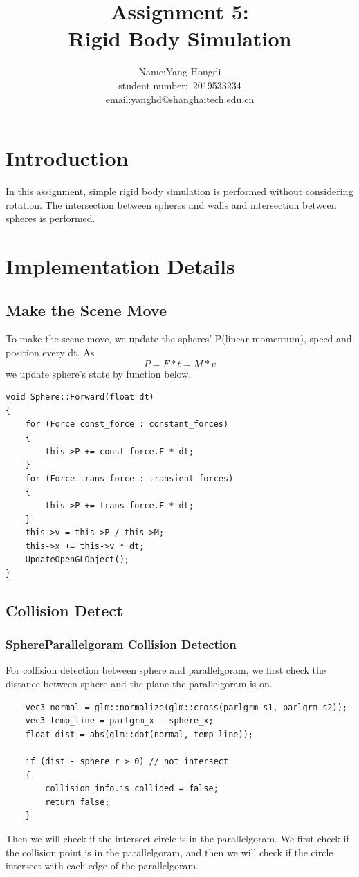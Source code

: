 \documentclass[acmtog]{acmart}
\title{Assignment 5:\\ {Rigid Body Simulation}}
\author{Name:\quad Yang Hongdi  \\ student number:\ 2019533234
\\email:\quad yanghd@shanghaitech.edu.cn}
\begin{document}
\maketitle

\vspace*{2 ex}

\section{Introduction}
In this assignment, simple rigid body simulation is performed without considering rotation. The intersection
between spheres and walls and intersection between spheres is performed.
\section{Implementation Details}
\subsection{Make the Scene Move}
To make the scene move, we update the spheres' P(linear momentum), speed and position every dt. As $$P = F * t = M * v$$
we update sphere's state by function below.
\begin{lstlisting}
void Sphere::Forward(float dt)
{
    for (Force const_force : constant_forces)
    {
        this->P += const_force.F * dt;
    }
    for (Force trans_force : transient_forces)
    {
        this->P += trans_force.F * dt;
    }
    this->v = this->P / this->M;
    this->x += this->v * dt;
    UpdateOpenGLObject();
}
\end{lstlisting}
\subsection{Collision Detect}
\subsubsection{SphereParallelgoram Collision Detection}
\quad For collision detection between sphere and parallelgoram, we first check the distance between sphere and the plane the parallelgoram is on.
\begin{lstlisting}
	vec3 normal = glm::normalize(glm::cross(parlgrm_s1, parlgrm_s2));
    vec3 temp_line = parlgrm_x - sphere_x;
    float dist = abs(glm::dot(normal, temp_line));

    if (dist - sphere_r > 0) // not intersect
    {
        collision_info.is_collided = false;
        return false;
    }
\end{lstlisting}
Then we will check if the intersect circle is in the parallelgoram. We first check if the collision point is in the parallelgoram, and then we will check
if the circle intersect with each edge of the parallelgoram.
\end{document}
